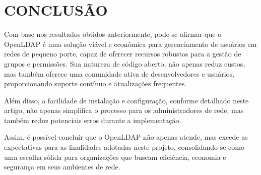 \section{CONCLUSÃO}
Com base nos resultados obtidos anteriormente, pode-se afirmar que o OpenLDAP é uma solução viável e econômica para gerenciamento de usuários em redes de pequeno porte, capaz de oferecer recursos robustos para a gestão de grupos e permissões. Sua natureza de código aberto, não apenas reduz custos, mas também oferece uma comunidade ativa de desenvolvedores e usuários, proporcionando suporte contínuo e atualizações frequentes.

Além disso, a facilidade de instalação e configuração, conforme detalhado neste artigo, não apenas simplifica o processo para os administradores de rede, mas também reduz potenciais erros durante a implementação.

Assim, é possível concluir que o OpenLDAP não apenas atende, mas excede as expectativas para as finalidades adotadas neste projeto, consolidando-se como uma escolha sólida para organizações que buscam eficiência, economia e segurança em seus ambientes de rede.
